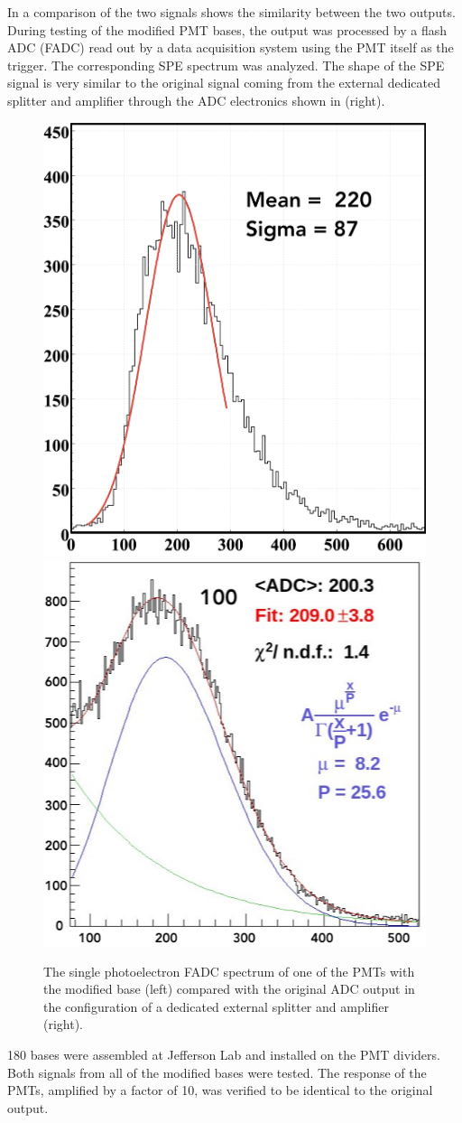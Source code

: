 In  a comparison of the two signals shows the similarity between the two outputs. During testing of the
modified PMT bases, the output was processed by a flash ADC (FADC) read out by a data acquisition system using the PMT
itself as the trigger. The corresponding SPE spectrum was analyzed. The shape of the SPE signal is very similar to the
original signal coming from the external dedicated splitter and amplifier through the ADC electronics shown in
 (right).

\begin{figure}
	\centering
	\includegraphics[width=0.47\columnwidth,height=0.75\columnwidth]{img/fadcOutput.png}
	\includegraphics[width=0.47\columnwidth,height=0.75\columnwidth]{img/cc_signal.png}
	\caption{The single photoelectron FADC spectrum of one of the PMTs with the modified base (left) compared with
          the original ADC output in the configuration of a dedicated external splitter and amplifier (right). }
	\label{fig:dividerTests}
\end{figure}

180 bases were assembled at Jefferson Lab and installed on the PMT dividers. Both signals from all of the modified
bases were tested. The response of the PMTs, amplified by a factor of 10, was verified to be identical to the original
output.


